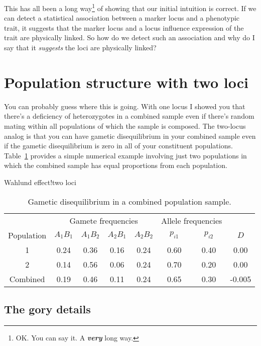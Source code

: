 \documentclass[12pt]{article}
\begin{document}
This has all been a long way\footnote{OK. You can say it. A {\bf\it
    very\/} long way.} of showing that our initial intuition is
correct. If we can detect a statistical association between a marker
locus and a phenotypic trait, it suggests that the marker locus and a
locus influence expression of the trait are physically linked. So how
do we detect such an association and why do I say that it {\it
  suggests} the loci are physically linked?

\section*{Population structure with two loci}

You can probably guess where this is going. With one locus I showed
you that there's a deficiency of heterozygotes in a combined sample
even if there's random mating within all populations of which the
sample is composed. The two-locus analog is that you can have gametic
disequilibrium in your combined sample even if the gametic
disequilibrium is zero in all of your constituent
populations. Table~\ref{table:d-structure} provides a simple numerical
example involving just two populations in which the combined sample
has equal proportions from each population.\item{Wahlund effect!two loci}

\begin{table}
\begin{center}
\begin{tabular}{c|cccc|cc|c}
\hline\hline
           & \multicolumn{4}{c|}{Gamete frequencies} 
           & \multicolumn{2}{c|}{Allele frequencies} \\
Population & $A_1B_1$ & $A_1B_2$ & $A_2B_1$ & $A_2B_2$ 
           & $p_{i1}$ & $p_{i2}$ & $D$ \\
\hline
1          & 0.24     & 0.36     & 0.16    & 0.24
           & 0.60     & 0.40     & 0.00 \\
2          & 0.14     & 0.56     & 0.06    & 0.24
           & 0.70     & 0.20     & 0.00 \\
Combined   & 0.19     & 0.46     & 0.11    & 0.24
           & 0.65     & 0.30     & -0.005 \\
\hline
\end{tabular}
\end{center}
\caption{Gametic disequilibrium in a combined population
  sample.}\label{table:d-structure}
\end{table}

\subsection*{The gory details}
\end{document}
